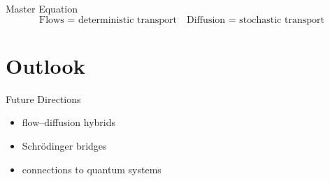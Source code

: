 \documentclass{beamer}
\begin{document}

\begin{frame}{Master Equation}
\[
\boxed{
\text{Flows = deterministic transport}
\quad
\text{Diffusion = stochastic transport}
}
\]
\end{frame}

\section{Outlook}

\begin{frame}{Future Directions}
\begin{itemize}
\item flow–diffusion hybrids
\item Schrödinger bridges
\item connections to quantum systems
\end{itemize}
\end{frame}
\end{document}
